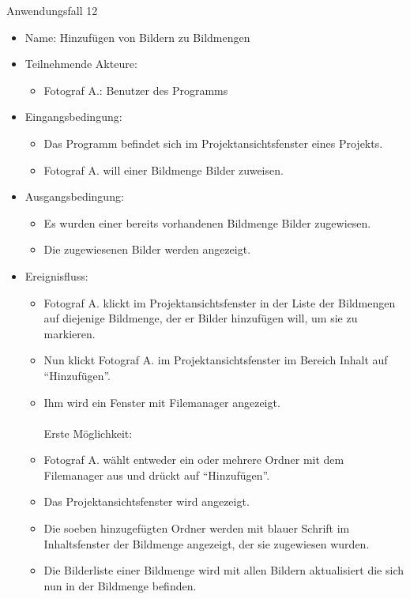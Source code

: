 \begin{itemize}
	\begin{description}
		\item[Anwendungsfall 12]
	\end{description}
	
	\begin{itemize}
		\item Name: Hinzufügen von Bildern zu Bildmengen
		\item Teilnehmende Akteure:
		\begin{itemize}
			\item	Fotograf A.: Benutzer des Programms		
		\end{itemize}
		\item Eingangsbedingung:
		\begin{itemize}
			\item	Das Programm befindet sich im Projektansichtsfenster eines Projekts.
			\item Fotograf A. will einer Bildmenge Bilder zuweisen.
		\end{itemize}
		\item Ausgangsbedingung:
		\begin{itemize}
			\item	Es wurden einer bereits vorhandenen Bildmenge Bilder zugewiesen.
			\item Die zugewiesenen Bilder werden angezeigt.
		\end{itemize}
		\item Ereignisfluss:
		\begin{itemize}
			\item Fotograf A. klickt im Projektansichtsfenster in der Liste der Bildmengen auf diejenige Bildmenge, der er Bilder hinzufügen will, um sie zu markieren.		
			\item Nun klickt Fotograf A. im Projektansichtsfenster im Bereich Inhalt auf "`Hinzufügen"'.
			\item Ihm wird ein Fenster mit Filemanager angezeigt.\\\\Erste Möglichkeit:\\
			\item Fotograf A. wählt entweder ein oder mehrere Ordner mit dem Filemanager aus und drückt auf "`Hinzufügen"'.
			\item Das Projektansichtsfenster wird angezeigt.
			\item Die soeben hinzugefügten Ordner werden mit blauer Schrift im Inhaltsfenster der Bildmenge angezeigt, der sie zugewiesen wurden.
			\item Die Bilderliste einer Bildmenge wird mit allen Bildern aktualisiert die sich nun in der Bildmenge befinden.

\end{itemize}
\end{itemize}
\end{itemize}
